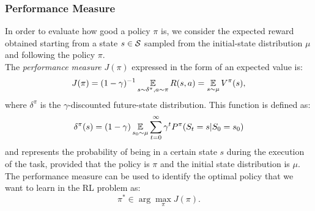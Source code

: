 \subsubsection{Performance Measure}
In order to evaluate how good a policy $\pi$ is, we consider the expected reward obtained starting from a state $s \in \mathcal{S}$ sampled from the initial-state distribution $\mu$ and following the policy $\pi$.\\
The \emph{performance measure} $J(\pi)$ expressed in the form of an expected value is:
$${J(\pi) = (1 - \gamma)^{-1}\operatorname*{\mathbb{E}}_{s\sim\delta^{\pi}, a \sim \pi}R(s,a)} = \operatorname*{\mathbb{E}}_{s\sim\mu}V^{\pi}(s),$$
where $\delta^{\pi}$ is the $\gamma$-discounted future-state distribution. This function is defined as:
$$\delta^{\pi}(s) = (1 - \gamma)\operatorname*{\mathbb{E}}_{s_{0}\sim\mu}\sum_{t=0}^{\infty}\gamma^t P^{\pi}(S_t = s|S_0=s_0)$$
and represents the probability of being in a certain state $s$ during the execution of the task, provided that the policy is $\pi$ and the initial state distribution is $\mu$.\\
The performance measure can be used to identify the optimal policy that we want to learn in the \ac{RL} problem as:
$$ \pi^{*} \in \arg \max_{\pi} J(\pi).$$

